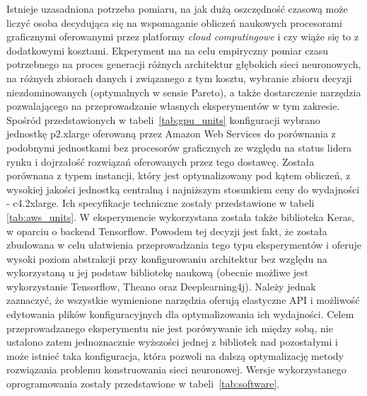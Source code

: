 \documentclass[12pt,a4paper,twoside]{article}
\begin{document}
Istnieje uzasadniona potrzeba pomiaru, na jak dużą oszczędność czasową może liczyć osoba decydująca się na wspomaganie obliczeń naukowych procesorami graficznymi oferowanymi przez platformy \textit{cloud computingowe} i czy wiąże się to z dodatkowymi kosztami. Ekperyment ma na celu empiryczny pomiar czasu potrzebnego na proces generacji różnych architektur głębokich sieci neuronowych, na różnych zbiorach danych i związanego z tym kosztu, wybranie zbioru decyzji niezdominowanych (optymalnych w sensie Pareto), a także dostarczenie narzędzia pozwalającego na przeprowadzanie własnych eksperymentów w tym zakresie.
Spośród przedstawionych w tabeli~\ref{tab:gpu_units} konfiguracji wybrano jednostkę p2.xlarge oferowaną przez Amazon Web Services do porównania z podobnymi jednostkami bez procesorów graficznych ze względu na status lidera rynku i dojrzałość rozwiązań oferowanych przez tego dostawcę. Została porównana z typem instancji, który jest optymalizowany pod kątem obliczeń, z wysokiej jakości jednostką centralną i najniższym stosunkiem ceny do wydajności - c4.2xlarge. Ich specyfikacje techniczne zostały przedstawione w tabeli \ref{tab:aws_units}.
W eksperymencie wykorzystana została także biblioteka Keras, w oparciu o backend Tensorflow. Powodem tej decyzji jest fakt, że została zbudowana w celu ułatwienia przeprowadzania tego typu eksperymentów i oferuje wysoki poziom abstrakcji przy konfigurowaniu architektur bez względu na wykorzystaną u jej podstaw bibliotekę naukową (obecnie możliwe jest wykorzystanie Tensorflow, Theano oraz Deeplearning4j). Należy jednak zaznaczyć, że wszystkie wymienione narzędzia oferują elastyczne API i możliwość edytowania plików konfiguracyjnych dla optymalizowania ich wydajności. Celem przeprowadzanego eksperymentu nie jest porówywanie ich między sobą, nie ustalono zatem jednoznacznie wyższości jednej z bibliotek nad pozostałymi i może istnieć taka konfiguracja, która pozwoli na dalszą optymalizację metody rozwiązania problemu konstruowania sieci neuronowej. Wersje wykorzystanego oprogramowania zostały przedstawione w tabeli~\ref{tab:software}.
\end{document}
